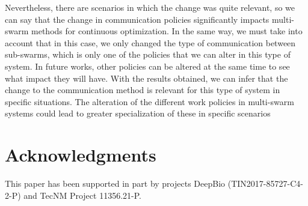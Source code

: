 \documentclass[runningheads]{llncs}
\begin{document}
Nevertheless, there are scenarios in which the change was quite relevant, so we
can say that the change in communication policies significantly impacts
multi-swarm methods for continuous optimization. In the same way, we must take
into account that in this case, we only changed the type of communication
between sub-swarms, which is only one of the policies that we can alter in this
type of system. In future works, other policies can be altered at the same time
to see what impact they will have. With the results obtained, we can infer that
the change to the communication method is relevant for this type of system in
specific situations. The alteration of the different work policies in
multi-swarm systems could lead to greater specialization of these in specific
scenarios


\section*{Acknowledgments}

This paper has been supported in part by projects DeepBio (TIN2017-85727-C4-2-P)
and TecNM Project 11356.21-P.

\printbibliography
\end{document}
